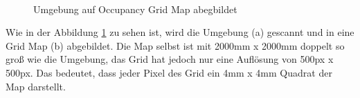 \begin{figure}[H]
    \centering
     \\
    \caption{Umgebung auf Occupancy Grid Map abegbildet}
    \label{fig:gridMap}
\end{figure}

Wie in der Abbildung \ref{fig:gridMap} zu sehen ist, wird die Umgebung (a) gescannt und in eine Grid Map (b) abgebildet.
Die Map selbst ist mit 2000mm x 2000mm doppelt so groß wie die Umgebung, das Grid hat jedoch nur eine Auflösung von 500px x 500px.
Das bedeutet, dass jeder Pixel des Grid ein 4mm x 4mm Quadrat der Map darstellt.

